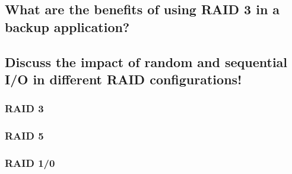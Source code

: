 \documentclass{article}
\begin{document}
\subsection{What are the benefits of using RAID 3 in a backup application?}

\subsection{Discuss the impact of random and sequential I/O in different RAID configurations!}
\subsubsection*{RAID 3}

\subsubsection*{RAID 5}

\subsubsection*{RAID 1/0}
\end{document}
